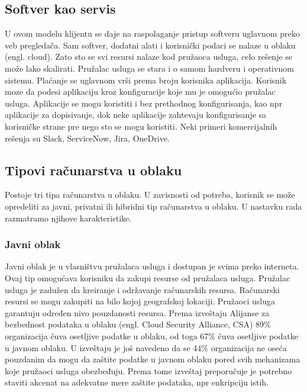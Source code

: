 \documentclass[12pt,oneside]{memoir}
\begin{document}
\subsection{Softver kao servis}
U ovom modelu klijentu se daje na raspolaganje pristup softveru uglavnom preko veb pregledača. Sam softver, dodatni alati i korisnički podaci se nalaze u oblaku (engl. cloud). Zato sto se svi resursi nalaze kod pružaoca usluga, celo rešenje se može lako skalirati. Pružalac usluga se stara i o samom hardveru i operativnom sistemu. Plaćanje se uglavnom vrši prema broju korisnika aplikacija. Korisnik moze da podesi aplikaciju kroz konfiguracije koje mu je omogućio pružalac usluga. Aplikacije se mogu koristiti i bez prethodnog konfigurisanja, kao npr aplikacije za dopisivanje, dok neke aplikacije zahtevaju konfigurisanje sa korisničke strane pre nego sto se mogu koristiti. Neki primeri komercijalnih rešenja su Slack, ServiceNow, Jira, OneDrive. %


\subsection{Tipovi računarstva u oblaku} %
 
Postoje tri tipa računarstva u oblaku. U zavisnosti od potreba, korisnik se može opredeliti za javni, privatni ili hibridni tip računarstva u oblaku. U nastavku rada razmatramo njihove karakteristike.


\subsubsection{Javni oblak} %
Javni oblak je u vlasništvu pružalaca usluga i dostupan je svima preko interneta. Ovaj tip omogućava korisniku da zakupi resurse od pružalaca usluga. Pružalac usluga je zadužen da kreiranje i održavanje računarskih resursa. Računarski resursi se mogu zakupiti na bilo kojoj geografskoj lokaciji. Pružaoci usluga garantuju određen nivo pouzdanosti resursa. Prema izveštaju Alijanse za bezbednost podataka u oblaku (engl. Cloud Security Alliance, CSA) 89\% organizacija čuva osetljive podatke u oblaku, od toga 67\% čuva osetljive podatke u javnom oblaku. U izveštaju je još navedeno da se 44\% organizacija ne oseća pouzdanim da mogu da zaštite podatke u javnom oblaku pored svih mehanizama koje pružaoci usluga obezbeđuju. Prema tome izveštaj preporučuje je potrebno staviti akcenat na adekvatne mere zaštite podataka, npr enkripciju istih\cite{csa}.
\end{document}
